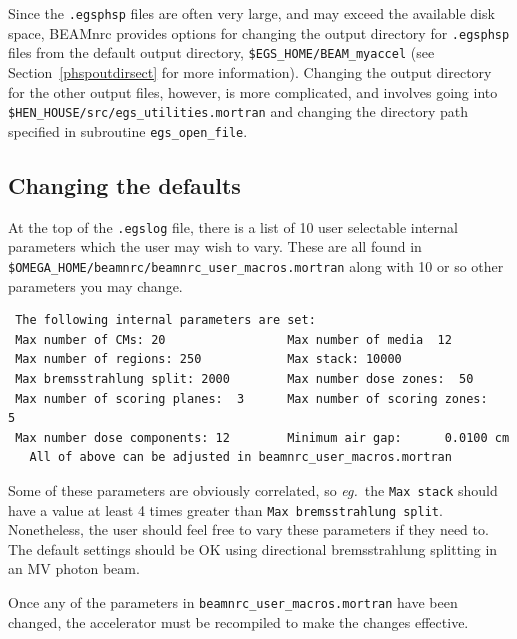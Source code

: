 \documentclass[12pt,twoside]{article}
\newcommand{\eg}{{\em eg.}}
\begin{document}
Since the {\tt .egsphsp} files are often very large, and may exceed the
available disk space, BEAMnrc provides options for changing the output
directory for {\tt .egsphsp} files from the default
output directory, {\tt \$EGS\_HOME/BEAM\_myaccel}
(see Section~\ref{phspoutdirsect} for more information).
Changing the output directory for the other output files, however, is
more complicated, and involves
going into {\tt \$HEN\_HOUSE/src/egs\_utilities.mortran} and changing
the directory path specified in subroutine {\tt egs\_open\_file}.

\subsection{Changing the defaults}
\label{ctd}
At the top of the \verb+.egslog+ file, there is a list of 10 user
selectable internal parameters which the user may wish to vary.  These
are all found in\\
\verb+$OMEGA_HOME/beamnrc/beamnrc_user_macros.mortran+ along
with 10 or so other parameters you may change.
\begin{verbatim}
 The following internal parameters are set:
 Max number of CMs: 20                 Max number of media  12
 Max number of regions: 250            Max stack: 10000
 Max bremsstrahlung split: 2000        Max number dose zones:  50
 Max number of scoring planes:  3      Max number of scoring zones:   5
 Max number dose components: 12        Minimum air gap:      0.0100 cm
   All of above can be adjusted in beamnrc_user_macros.mortran
\end{verbatim}

Some of these parameters are obviously correlated, so \eg\ the
\verb+Max stack+ should have a value at least 4 times greater than
\verb+Max bremsstrahlung split+. Nonetheless, the user should feel free
to vary these parameters if they need to. The default settings should be OK
using directional bremsstrahlung splitting in an MV photon beam.

Once any of the parameters in {\tt beamnrc\_user\_macros.mortran} have
been changed, the accelerator must be recompiled to make the changes
effective.
\end{document}
